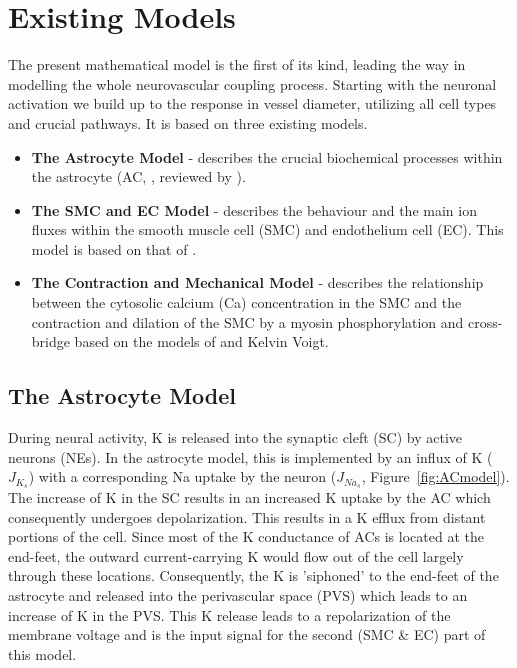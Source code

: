\section{Existing Models}

The present mathematical model is the first of its kind, leading the way in modelling the whole neurovascular coupling process. Starting with the neuronal activation we build up to the response in vessel diameter, utilizing all cell types and crucial pathways.  It is based on three existing models. 

\begin{itemize}
\item \textbf{The Astrocyte Model} - describes the crucial biochemical processes within the astrocyte (AC, \citet{Ostby2009}, reviewed  by \citet{LoesEvert}). 
\item  \textbf{The SMC and EC Model} - describes the behaviour and the main ion fluxes within the smooth muscle cell (SMC) and endothelium cell (EC). This model is based on that of \citet{Koenigsberger2006}. 
\item \textbf{The Contraction and Mechanical Model} -  describes the relationship between the cytosolic calcium (\gls{Ca}) concentration in the SMC and the contraction and dilation of the SMC by a myosin phosphorylation and cross-bridge based on the models of \citet{Hai1989} and Kelvin Voigt. \\
\end{itemize}

\subsection{The Astrocyte Model}
During neural activity, \gls{K} is released into the synaptic cleft (SC) by active neurons (NEs). In the astrocyte model, this is implemented by an influx of \gls{K} ($J_{K_s}$) with a corresponding \gls{Na} uptake by the neuron ($ J_{Na_s} $, Figure~\ref{fig:ACmodel}).
The increase of \gls{K} in the SC results in an increased \gls{K} uptake by the \gls{AC} which consequently undergoes depolarization. This results in a \gls{K} efflux from distant portions of the cell. Since most of the \gls{K} conductance of \gls{AC}s is located at the end-feet, the outward current-carrying \gls{K} would flow out of the cell largely through these locations. Consequently, the \gls{K} is 'siphoned' to the end-feet of the astrocyte and released into the perivascular space (\gls{PVS}) which leads to an increase of \gls{K} in the PVS. This \gls{K} release leads to a repolarization of the membrane voltage and is the input signal for the second (SMC \& EC) part of this model. \\

